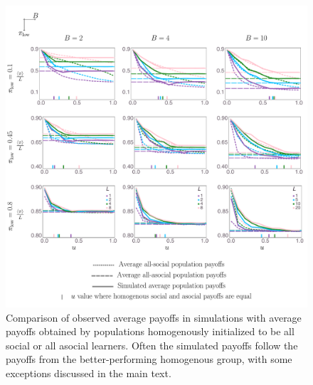 \documentclass[letterpaper,11.5pt]{scrartcl}
\begin{document}
\clearpage
\begin{figure}
  \caption{Comparison of observed average payoffs in simulations with average payoffs
    obtained by populations homogenously initialized to be all social or all asocial learners.
    Often the simulated payoffs follow the payoffs from the better-performing
    homogenous group, with some exceptions discussed in the main text.
}
  \label{fig:payoffs}
  \centering
    \includegraphics[width=\textwidth]{Figures/meanNetPayoffs.pdf}
\end{figure}
\end{document}
